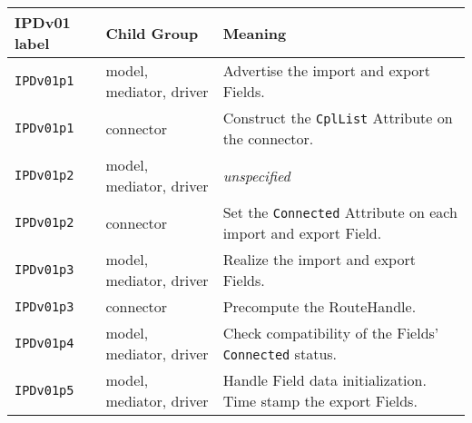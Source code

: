 \vspace*{3ex}
\begin{tabular}[h]{|p{35mm}|p{4cm}|p{6cm}|}
     \hline\hline
     {\bf IPDv01 label} & {\bf Child Group} & {\bf Meaning}\\
     \hline\hline
     {\tt IPDv01p1} & model, mediator, driver & Advertise the import and export Fields.\\ \hline
     {\tt IPDv01p1} & connector               & Construct the {\tt CplList} Attribute on the connector.\\ \hline
     {\tt IPDv01p2} & model, mediator, driver & {\em unspecified}\\ \hline
     {\tt IPDv01p2} & connector               & Set the {\tt Connected} Attribute on each import and export Field.\\ \hline
     {\tt IPDv01p3} & model, mediator, driver & Realize the import and export Fields.\\ \hline
     {\tt IPDv01p3} & connector               & Precompute the RouteHandle.\\ \hline
     {\tt IPDv01p4} & model, mediator, driver & Check compatibility of the Fields' {\tt Connected} status.\\ \hline
     {\tt IPDv01p5} & model, mediator, driver & Handle Field data initialization. Time stamp the export Fields.\\
     \hline\hline
\end{tabular}\newline

